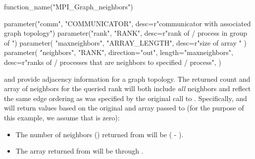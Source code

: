 \begin{mpi-binding}
    function_name("MPI_Graph_neighbors")

    parameter("comm", "COMMUNICATOR", desc=r"communicator with associated graph topology")
    parameter("rank", "RANK", desc=r"rank of \MPI/ process in group of ")
    parameter(
        "maxneighbors", "ARRAY_LENGTH", desc=r"size of array "
    )
    parameter(
        "neighbors",
        "RANK",
        direction="out",
        length="maxneighbors",
        desc=r"ranks of \MPI/ processes that are neighbors to specified \MPI/ process",
    )
\end{mpi-binding}

\begin{sloppy}
 and  provide  
adjacency information for a graph topology.  
The returned count and array of neighbors for the queried rank will 
both include \emph{all} neighbors and reflect the same edge ordering as 
was specified by the original call to . 
Specifically,  and 
 will return values based on the original 
 and  array passed to 
(for the purpose of this example, we assume that  is zero):

\end{sloppy}
\begin{itemize} 
\item The number of neighbors () returned from\flushline %
   will be ( - 
  ). 
\item The  array returned from 
   will be {\gb\mbox{}}
  through {\gb\mbox{}}.
\end{itemize} 
 
